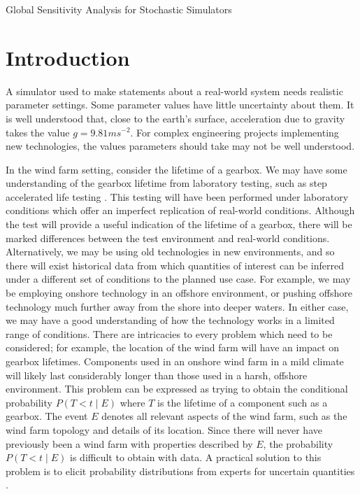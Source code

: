 \begin{chapter}{Global Sensitivity Analysis for Stochastic Simulators\label{Ch:sensitivity}}
\section{Introduction}
A simulator used to make statements about a real-world system needs realistic parameter settings. Some parameter values have little uncertainty about them. It is well understood that, close to the earth's surface, acceleration due to gravity takes the value $g = 9.81ms^{-2}$. For complex engineering projects implementing new technologies, the values parameters should take may not be well understood.

In the wind farm setting, consider the lifetime of a gearbox. We may have some understanding of the gearbox lifetime from laboratory testing, such as step accelerated life testing \citep{Nelson1980}. This testing will have been performed under laboratory conditions which offer an imperfect replication of real-world conditions. Although the test will provide a useful indication of the lifetime of a gearbox, there will be marked differences between the test environment and real-world conditions. Alternatively, we may be using old technologies in new environments, and so there will exist historical data from which quantities of interest can be inferred under a different set of conditions to the planned use case. For example, we may be employing onshore technology in an offshore environment, or pushing offshore technology much further away from the shore into deeper waters. In either case, we may have a good understanding of how the technology works in a limited range of conditions. There are intricacies to every problem which need to be considered; for example, the location of the wind farm will have an impact on gearbox lifetimes. Components used in an onshore wind farm in a mild climate will likely last considerably longer than those used in a harsh, offshore environment. This problem can be expressed as trying to obtain the conditional probability $P(T < t \mid E )$ where $T$ is the lifetime of a component such as a gearbox. The event $E$ denotes all relevant aspects of the wind farm, such as the wind farm topology and details of its location. Since there will never have previously been a wind farm with properties described by $E$, the probability $P(T < t \mid E)$ is difficult to obtain with data. A practical solution to this problem is to elicit probability distributions from experts for uncertain quantities \citep{Syed2020, Wilson2021, Dalal2022}.


\end{chapter}
